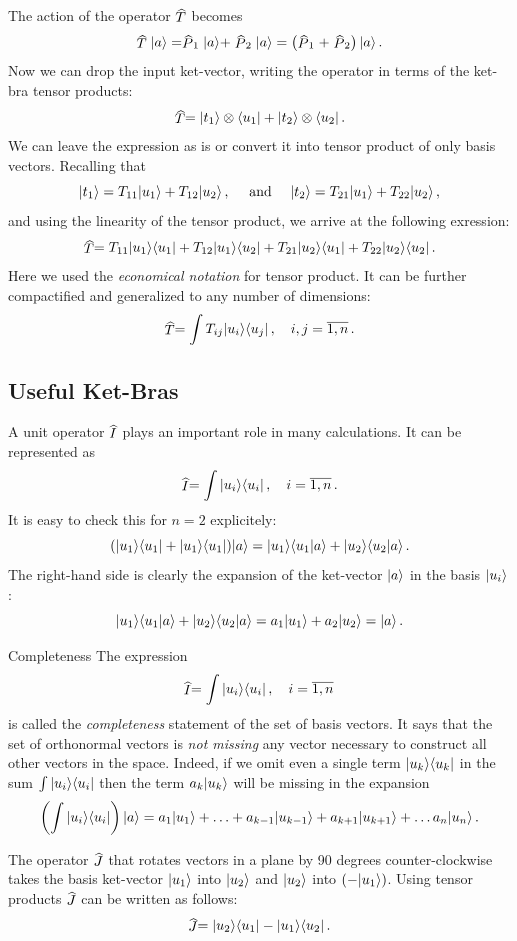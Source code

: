The action of the operator $\op{T}$ becomes
\[
\op{T}\ket{a}=\op{P}_1\ket{a}+\op{P}_2\ket{a}=\left(\op{P}_1+\op{P}_2\right)\ket{a}\,.
\]
Now we can drop the input ket-vector, writing the operator in terms of the ket-bra tensor products:
\[
\op{T}=\ket{t_1}\otimes\bra{u_1}+\ket{t_2}\otimes\bra{u_2}\,.
\]
We can leave the expression as is or convert it into tensor product of only basis vectors. Recalling that 
\[
|{t_1}\rangle=T_{11}|{u_1}\rangle+T_{12}|{u_2}\rangle\,,\quad\textrm{ and }\quad |{t_2}\rangle=T_{21}|{u_1}\rangle+T_{22}|{u_2}\rangle\,,
\]
and using the linearity of the tensor product, we arrive at the following exression:
\[
\op{T}=T_{11}\ket{u_1}\bra{u_1}+T_{12}\ket{u_1}\bra{u_2}+
T_{21}\ket{u_2}\bra{u_1}+T_{22}\ket{u_2}\bra{u_2}\,.
\]
Here we used the \emph{economical notation} for tensor product. It can be further compactified and generalized to any number of dimensions:
\[
\op{T}=\int T_{ij}\ket{u_i}\bra{u_j}\,,\quad i,j=\overline{1,n}\,.
\]
\subsection{Useful Ket-Bras}
A unit operator $\op{I}$ plays an important role in many calculations. It can be represented as 
\[
\op{I}=\int\ketbra{u_i}{u_i}\,,\quad i=\overline{1,n}\,.
\]
It is easy to check this for $n=2$ explicitely:
\[
(|{u_1}\rangle\langle{u_1}|+|{u_1}\rangle\langle{u_1}|)|{a}\rangle=|{u_1}\rangle\langle{u_1}|{a\rangle}+|{u_2}\rangle\langle{u_2}|{a\rangle}\,.
\]
The right-hand side is clearly the expansion of the ket-vector $|{a}\rangle$ in the basis $|{u_i}\rangle$:
\[
|{u_1}\rangle\langle{u_1}|{a\rangle}+|{u_2}\rangle\langle{u_2}|{a\rangle}=a_1|{u_1}\rangle+a_2|{u_2}\rangle=|{a}\rangle\,.
\]
\begin{mybio}{Completeness}
	The expression
	\[
	\op{I}=\int\ketbra{u_i}{u_i}\,,\quad i=\overline{1,n}\,
	\]
	is called the \emph{completeness} statement of the set of basis vectors. It says that the set of orthonormal vectors is \emph{not missing} any vector necessary to construct all other vectors in the space. Indeed, if we omit even a single term $|{u_k}\rangle\langle{u_k}|$ in the sum $\int|{u_i}\rangle\langle{u_i}|$ then the term $a_k|{u_k}\rangle$ will be missing in the expansion
	\[
	\left(\int|{u_i}\rangle\langle{u_i}|\right)|{a}\rangle=a_1|{u_1}\rangle+\ldots+a_{k-1}|{u_{k-1}}\rangle+a_{k+1}|{u_{k+1}}\rangle+\ldots a_n|{u_n}\rangle\,.
	\]
\end{mybio}

The operator $\op{J}$ that rotates vectors in a plane by 90 degrees counter-clockwise takes the basis ket-vector $|{u_1}\rangle$ into $|{u_2}\rangle$ and $|{u_2}\rangle$ into $(-|{u_1}\rangle)$. Using tensor products $\op{J}$ can be written as follows:
\[
\op{J}=\ketbra{u_2}{u_1}-\ketbra{u_1}{u_2}\,.
\]

